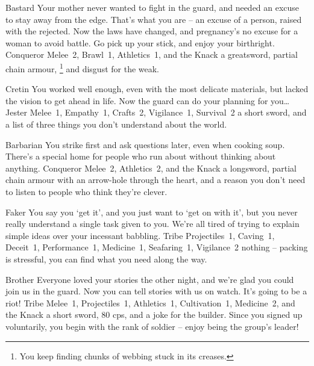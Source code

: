 \begin{multicols}{2}
\begin{itemize}

  {Bastard}%
  {Your mother never wanted to fight in the \gls{guard}, and needed an excuse to stay away from the \gls{edge}.
  That's what you are -- an excuse of a person, raised with the rejected.
  Now the laws have changed, and pregnancy's no excuse for a woman to avoid battle.
  Go pick up your stick, and enjoy your birthright.}%
  {Conqueror}%
  {Melee~2, Brawl~1, Athletics~1, and the Knack \adrenalinesurge}%
  {a greatsword, partial chain armour,%
  \footnote{You keep finding chunks of webbing stuck in its creases.}
  and disgust for the weak.}%

  {Cretin}%
  {You worked well enough, even with the most delicate materials, but lacked the vision to get ahead in life.
  Now the \gls{guard} can do your planning for you\ldots
  }%
  {Jester}%
  {Melee~1, Empathy~1, Crafts~2, Vigilance~1, Survival~2}%
  {a short sword, and a list of three things you don't understand about the world.}%


  {Barbarian}%
  {You strike first and ask questions later, even when cooking soup.
  There's a special home for people who run about without thinking about anything.
  }%
  {Conqueror}%
  {Melee~2, Athletics~2, and the Knack \laststand}%
  {a longsword, partial chain armour with an arrow-hole through the heart, and a reason you don't need to listen to people who think they're clever.}%


  {Faker}%
  {You say you `get it', and you just want to `get on with it', but you never really understand a single task given to you.
  We're all tired of trying to explain simple ideas over your incessant babbling.
  }%
  {Tribe}%
  {Projectiles~1, Caving~1, Deceit~1, Performance~1, Medicine~1, Seafaring~1, Vigilance~2}%
  {nothing -- packing is stressful, you can find what you need along the way.}%

  {Brother}%
  {Everyone loved your stories the other night, and we're glad you could join us in the \gls{guard}.
  Now you can tell stories with us on watch.
  It's going to be a riot!
  }%
  {Tribe}%
  {Melee~1, Projectiles~1, Athletics~1, Cultivation~1, Medicine~2, and the Knack \guardian}%
  {a short sword, 80 \glspl{cp}, and a joke for the \gls{builder}.
  Since you signed up voluntarily, you begin with the rank of \gls{soldier} -- enjoy being the group's leader!}%


\end{itemize}
\end{multicols}
